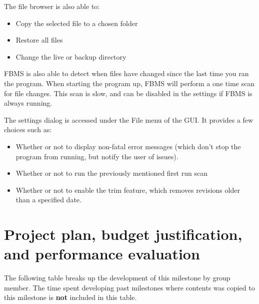 \documentclass[12pt,a4paper]{article}
\begin{document}
The file browser is also able to:

\begin{itemize}
\item Copy the selected file to a chosen folder
\item Restore all files
\item Change the live or backup directory
\end{itemize}

FBMS is also able to detect when files have changed since the last time you ran the program. When starting the program up, FBMS will perform a one time scan for file changes. This scan is slow, and can be disabled in the settings if FBMS is always running.

The settings dialog is accessed under the File menu of the GUI. It provides a few choices such as:

\begin{itemize}
\item Whether or not to display non-fatal error messages (which don't stop the program from running, but notify the user of issues).
\item Whether or not to run the previously mentioned first run scan
\item Whether or not to enable the trim feature, which removes revisions older than a specified date.
\end{itemize}

\section{Project plan, budget justification, and performance evaluation}
The following table breaks up the development of this milestone by group member. The time spent developing past milestones where contents was copied to this milestone is \textbf{not} included in this table.
\end{document}
